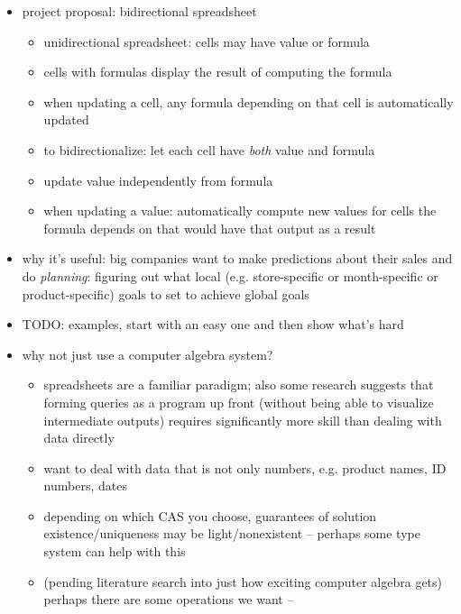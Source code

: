 \documentclass{article}
\begin{document}
\begin{itemize}
    \item project proposal: bidirectional spreadsheet
        \begin{itemize}
            \item unidirectional spreadsheet: cells may have value or
                formula
            \item cells with formulas display the result of computing the
                formula
            \item when updating a cell, any formula depending on that cell
                is automatically updated
            \item to bidirectionalize: let each cell have \emph{both} value
                and formula
            \item update value independently from formula
            \item when updating a value: automatically compute new values
                for cells the formula depends on that would have that output
                as a result
        \end{itemize}
    \item why it's useful: big companies want to make predictions about
        their sales and do \emph{planning}: figuring out what local (e.g.
        store-specific or month-specific or product-specific) goals to set
        to achieve global goals
    \item TODO: examples, start with an easy one and then show what's hard
    \item why not just use a computer algebra system?
        \begin{itemize}
            \item spreadsheets are a familiar paradigm; also some research
                suggests that forming queries as a program up front (without
                being able to visualize intermediate outputs) requires
                significantly more skill than dealing with data directly
            \item want to deal with data that is not only numbers, e.g.
                product names, ID numbers, dates
            \item depending on which CAS you choose, guarantees of solution
                existence/uniqueness may be light/nonexistent -- perhaps
                some type system can help with this
            \item (pending literature search into just how exciting computer
                algebra gets) perhaps there are some operations we want --

\end{itemize}
\end{itemize}
\end{document}
